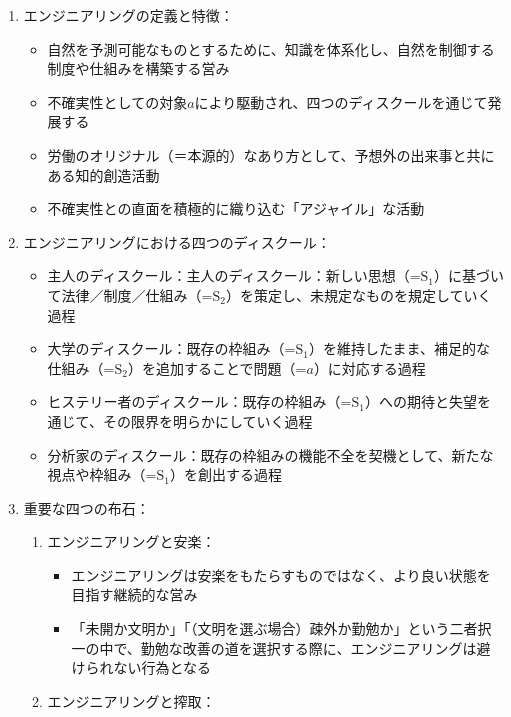 \begin{enumerate}
\def\labelenumi{\arabic{enumi}.}
\tightlist
\item
  エンジニアリングの定義と特徴：

  \begin{itemize}
  \tightlist
  \item
    自然を予測可能なものとするために、知識を体系化し、自然を制御する制度や仕組みを構築する営み
  \item
    不確実性としての対象\(a\)により駆動され、四つのディスクールを通じて発展する
  \item
    労働のオリジナル（＝本源的）なあり方として、予想外の出来事と共にある知的創造活動
  \item
    不確実性との直面を積極的に織り込む「アジャイル」な活動
  \end{itemize}
\item
  エンジニアリングにおける四つのディスクール：

  \begin{itemize}
  \tightlist
  \item
    主人のディスクール：主人のディスクール：新しい思想（=\(\textrm{S}_1\)）に基づいて法律／制度／仕組み（=\(\textrm{S}_2\)）を策定し、未規定なものを規定していく過程
  \item
    大学のディスクール：既存の枠組み（=\(\textrm{S}_1\)）を維持したまま、補足的な仕組み（=\(\textrm{S}_2\)）を追加することで問題（=\(a\)）に対応する過程
  \item
    ヒステリー者のディスクール：既存の枠組み（=\(\textrm{S}_1\)）への期待と失望を通じて、その限界を明らかにしていく過程
  \item
    分析家のディスクール：既存の枠組みの機能不全を契機として、新たな視点や枠組み（=\(\textrm{S}_1\)）を創出する過程
  \end{itemize}
\item
  重要な四つの布石：

  \begin{enumerate}
  \def\labelenumii{\alph{enumii}.}
  \tightlist
  \item
    エンジニアリングと安楽：

    \begin{itemize}
    \tightlist
    \item
      エンジニアリングは安楽をもたらすものではなく、より良い状態を目指す継続的な営み
    \item
      「未開か文明か」「（文明を選ぶ場合）疎外か勤勉か」という二者択一の中で、勤勉な改善の道を選択する際に、エンジニアリングは避けられない行為となる
    \end{itemize}
  \item
    エンジニアリングと搾取：


\end{enumerate}
\end{enumerate}
